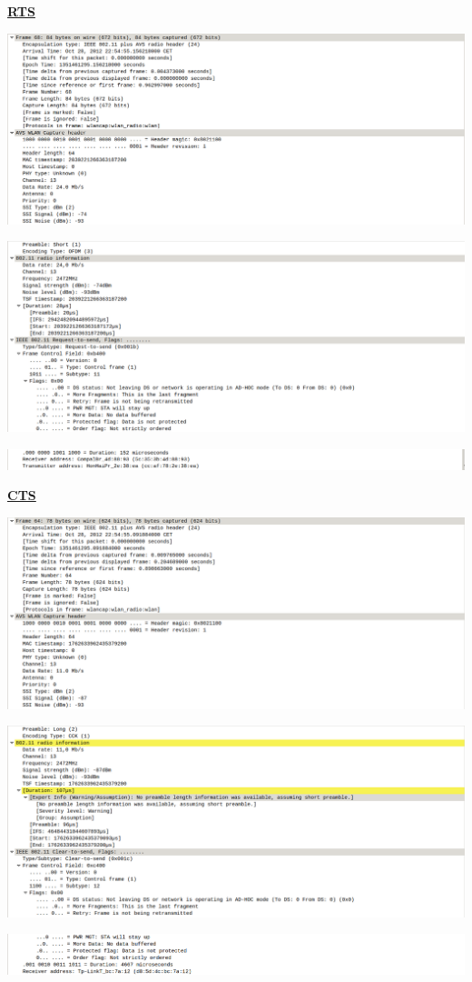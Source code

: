 \documentclass{article}
\begin{document}
\textbf{\underline{RTS}}

\begin{center}
\includegraphics[scale=0.3]{WLAN/rts1.png}
\end{center}
\begin{center}
\includegraphics[scale=0.3]{WLAN/rts2.png}
\end{center}
\begin{center}
\includegraphics[scale=0.3]{WLAN/rts3.png}
\end{center}

\textbf{\underline{CTS}}

\begin{center}
\includegraphics[scale=0.3]{WLAN/cts1.png}
\end{center}
\begin{center}
\includegraphics[scale=0.3]{WLAN/cts2.png}
\end{center}
\begin{center}
\includegraphics[scale=0.3]{WLAN/cts3.png}
\end{center}
\end{document}
